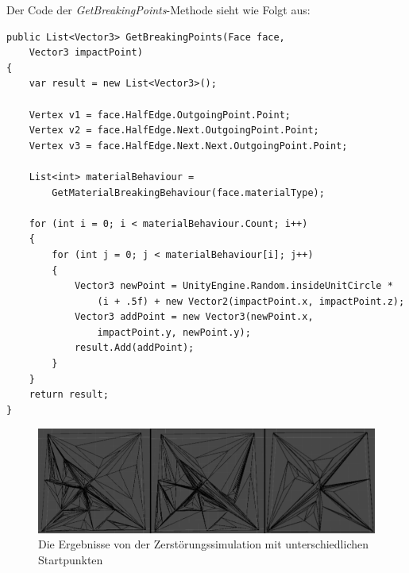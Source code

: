 Der Code der \textit{GetBreakingPoints}-Methode sieht wie Folgt aus:
\begin{lstlisting}
public List<Vector3> GetBreakingPoints(Face face,
	Vector3 impactPoint)
{
	var result = new List<Vector3>();
	
	Vertex v1 = face.HalfEdge.OutgoingPoint.Point;
	Vertex v2 = face.HalfEdge.Next.OutgoingPoint.Point;
	Vertex v3 = face.HalfEdge.Next.Next.OutgoingPoint.Point;
	
	List<int> materialBehaviour =
		GetMaterialBreakingBehaviour(face.materialType);
	
	for (int i = 0; i < materialBehaviour.Count; i++)
	{
		for (int j = 0; j < materialBehaviour[i]; j++)
		{
			Vector3 newPoint = UnityEngine.Random.insideUnitCircle *
				(i + .5f) + new Vector2(impactPoint.x, impactPoint.z);
			Vector3 addPoint = new Vector3(newPoint.x,
				impactPoint.y, newPoint.y);
			result.Add(addPoint);
		}
	}
	return result;
}

\end{lstlisting}
\begin{figure}[H]
	\centering
	\includegraphics[width=0.9\linewidth]{Images/DestructionExample}
	\caption{Die Ergebnisse von der Zerst\"orungssimulation mit unterschiedlichen Startpunkten}
	\label{fig:destructionexample}
\end{figure}
